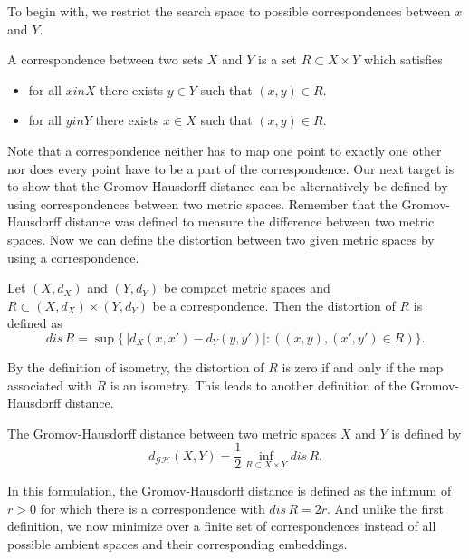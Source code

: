 To begin with, we restrict the search space to possible correspondences between $x$ and $Y$.
\begin{mydef}[correspondence]
	A correspondence between two sets $X$ and $Y$ is a set $R \subset X \times Y$ which satisfies
	\begin{itemize}
		\item for all $x in X$ there exists $y\in Y$ such that $(x,y) \in R$.
		\item for all $y in Y$ there exists $x\in X$ such that $(x,y) \in R$.
	\end{itemize}
\end{mydef}
Note that a correspondence neither has to map one point to exactly one other nor does every point have to be a part of the correspondence.
Our next target is to show that the Gromov-Hausdorff distance can be alternatively be defined by using correspondences between two metric spaces.
Remember that the Gromov-Hausdorff distance was defined to measure the difference between two metric spaces.
Now we can define the distortion between two given metric spaces by using a correspondence.
\begin{mydef}
	Let $(X,d_X)$ and $(Y,d_Y)$ be compact metric spaces and $R \subset (X,d_X) \times (Y,d_Y)$ be a correspondence.
	Then the distortion of $R$ is defined as
	$$dis\,R = \sup\{\,|d_X(x,x') - d_Y(y,y')|: \left( (x,y), (x',y') \in R \right)\}.$$
\end{mydef}
By the definition of isometry, the distortion of $R$ is zero if and only if the map associated with $R$ is an isometry.
This leads to another definition of the Gromov-Hausdorff distance.
\begin{mydef}
	The Gromov-Hausdorff distance between two metric spaces $X$ and $Y$ is defined by
	$$d_\mathcal{GH}(X,Y) = \frac{1}{2} \inf_{R \subset X \times Y} dis \, R.$$
\end{mydef}
In this formulation, the Gromov-Hausdorff distance is defined as the infimum of $r > 0$ for which there is a correspondence with $dis\,R = 2r$.
And unlike the first definition, we now minimize over a finite set of correspondences instead of all possible ambient spaces and their corresponding embeddings.

